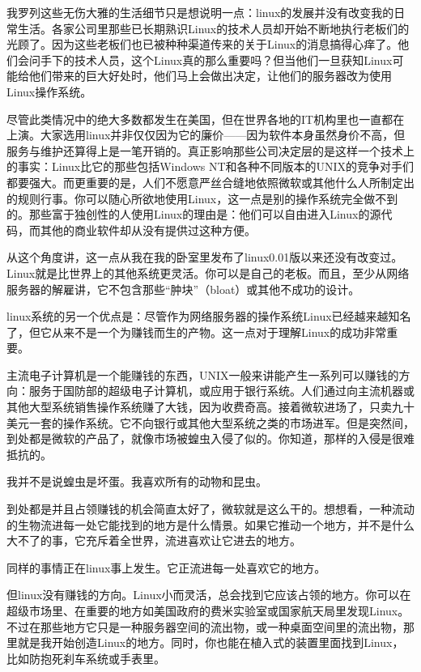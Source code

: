 我罗列这些无伤大雅的生活细节只是想说明一点：linux的发展并没有改变我的日常生活。各家公司里那些已长期熟识Linux的技术人员却开始不断地执行老板们的光顾了。因为这些老板们也已被种种渠道传来的关于Linux的消息搞得心痒了。他们会问手下的技术人员，这个Linux真的那么重要吗？但当他们一旦获知Linux可能给他们带来的巨大好处时，他们马上会做出决定，让他们的服务器改为使用Linux操作系统。

尽管此类情况中的绝大多数都发生在美国，但在世界各地的IT机构里也一直都在上演。大家选用linux并非仅仅因为它的廉价——因为软件本身虽然身价不高，但服务与维护还算得上是一笔开销的。真正影响那些公司决定层的是这样一个技术上的事实：Linux比它的那些包括Windows NT和各种不同版本的UNIX的竞争对手们都要强大。而更重要的是，人们不愿意严丝合缝地依照微软或其他什么人所制定出的规则行事。你可以随心所欲地使用Linux，这一点是别的操作系统完全做不到的。那些富于独创性的人使用Linux的理由是：他们可以自由进入Linux的源代码，而其他的商业软件却从没有提供过这种方便。

从这个角度讲，这一点从我在我的卧室里发布了linux0.01版以来还没有改变过。Linux就是比世界上的其他系统更灵活。你可以是自己的老板。而且，至少从网络服务器的解雇讲，它不包含那些“肿块”（bloat）或其他不成功的设计。

linux系统的另一个优点是：尽管作为网络服务器的操作系统Linux已经越来越知名了，但它从来不是一个为赚钱而生的产物。这一点对于理解Linux的成功非常重要。

主流电子计算机是一个能赚钱的东西，UNIX一般来讲能产生一系列可以赚钱的方向：服务于国防部的超级电子计算机，或应用于银行系统。人们通过向主流机器或其他大型系统销售操作系统赚了大钱，因为收费奇高。接着微软进场了，只卖九十美元一套的操作系统。它不向银行或其他大型系统之类的市场进军。但是突然间，到处都是微软的产品了，就像市场被蝗虫入侵了似的。你知道，那样的入侵是很难抵抗的。

我并不是说蝗虫是坏蛋。我喜欢所有的动物和昆虫。

到处都是并且占领赚钱的机会简直太好了，微软就是这么干的。想想看，一种流动的生物流进每一处它能找到的地方是什么情景。如果它推动一个地方，并不是什么大不了的事，它充斥着全世界，流进喜欢让它进去的地方。

同样的事情正在linux事上发生。它正流进每一处喜欢它的地方。

但linux没有赚钱的方向。Linux小而灵活，总会找到它应该占领的地方。你可以在超级市场里、在重要的地方如美国政府的费米实验室或国家航天局里发现Linux。不过在那些地方它只是一种服务器空间的流出物，或一种桌面空间里的流出物，那里就是我开始创造Linux的地方。同时，你也能在植入式的装置里面找到Linux，比如防抱死刹车系统或手表里。

